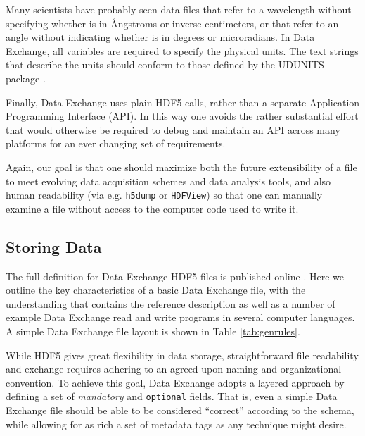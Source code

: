 \documentclass[pdf]{iucr}              %
\begin{document}
Many scientists have probably seen data files that refer to a wavelength without specifying whether is in \AA{}ngstroms or inverse centimeters, or that refer to an angle without indicating whether is in degrees or microradians. In Data Exchange, all variables are required to specify the physical units. The text strings that describe the units should conform to those defined by the UDUNITS package \cite{ucar_2013}.

Finally, Data Exchange uses plain HDF5 calls, rather than a separate Application Programming Interface (API). In this way one avoids the rather substantial effort that would otherwise be required to debug and maintain an API across many platforms for an ever changing set of requirements.

Again, our goal is that one should maximize both the future extensibility of a file to meet evolving data acquisition schemes and data analysis tools, and also human readability (via e.g. \texttt{h5dump} or \texttt{HDFView}) so that one can manually examine a file without access to the computer code used to write it.

\subsection{Storing Data}

The full definition for Data Exchange HDF5 files is published online \cite{data_exchange}. Here we outline the key characteristics of a basic Data Exchange file, with the understanding that \cite{data_exchange} contains the reference description as well as a number of example Data Exchange read and write programs in several computer languages. A simple Data Exchange file layout is shown in Table \ref{tab:genrules}.

While HDF5 gives great flexibility in data storage, straightforward file readability and exchange requires adhering to an agreed-upon naming and organizational convention. To achieve this goal, Data Exchange adopts a layered approach by defining a set of \emph{mandatory} and \texttt{optional} fields. That is, even a simple Data Exchange file should be able to be considered ``correct'' according to the schema, while allowing for as rich a set of metadata tags as any technique might desire.  
\end{document}
